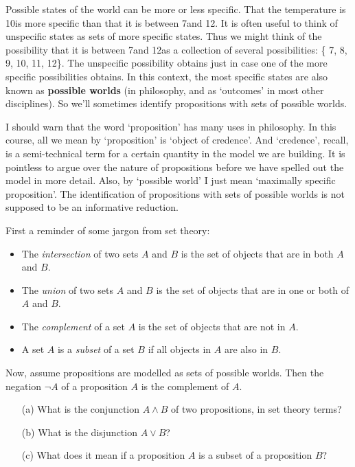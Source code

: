 
Possible states of the world can be more or less specific. That the
temperature is 10\celsius is more specific than that it is between
7\celsius and 12\celsius. It is often useful to think of unspecific
states as sets of more specific states. Thus we might think of the
possibility that it is between 7\celsius and 12\celsius as a
collection of several possibilities: \{ 7\celsius, 8\celsius,
9\celsius, 10\celsius, 11\celsius, 12\celsius \}. The unspecific
possibility obtains just in case one of the more specific
possibilities obtains. In this context, the most specific states are
also known as \textbf{possible worlds} (in philosophy, and as
`outcomes' in most other disciplines). So we'll sometimes identify
propositions with sets of possible worlds.

I should warn that the word `proposition' has many uses in
philosophy. In this course, all we mean by `proposition' is `object of
credence'. And `credence', recall, is a semi-technical term for a
certain quantity in the model we are building. It is pointless to
argue over the nature of propositions before we have spelled out the
model in more detail. Also, by `possible world' I just mean `maximally
specific proposition'. The identification of propositions with sets of
possible worlds is not supposed to be an informative reduction.

\begin{exercise}
  First a reminder of some jargon from set theory:
  \begin{itemize}
    \itemsep0em
  \item The \emph{intersection} of two sets $A$ and $B$ is the set of
    objects that are in both $A$ and $B$.
  \item The \emph{union} of two sets $A$ and $B$ is the set of objects
    that are in one or both of $A$ and $B$.
  \item The \emph{complement} of a set $A$ is the set of objects that
    are not in $A$.
  \item A set $A$ is a \emph{subset} of a set $B$ if all objects in
    $A$ are also in $B$.
  \end{itemize}

  Now, assume propositions are modelled as sets of possible
  worlds. Then the negation $\neg A$ of a proposition $A$ is the
  complement of $A$.
  \begin{enumerate}
    \itemsep0em
  \item[(a)] What is the conjunction $A \land B$ of two propositions,
    in set theory terms?
  \item[(b)] What is the disjunction $A \lor B$?
  \item[(c)] What does it mean if a proposition $A$ is a subset of
    a proposition $B$?
  \end{enumerate}
  \vspace{-1em}
\end{exercise}


